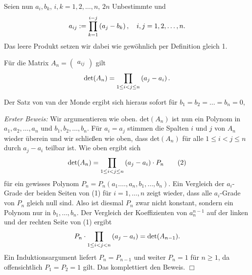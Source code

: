 \documentclass[11pt,a4paper]{article}
\begin{document}
Seien nun $a_i,b_k$, $i,k=1,2,\dots,n$, $2n$ Unbestimmte und 
\begin{gather*}
  a_{ij}:=\prod_{k=1}^{i-j}\left(a_j-b_k\right),\quad i,j=1,2,\dots,n.
\end{gather*}
Das leere Produkt setzen wir dabei wie gewöhnlich per Definition gleich 1.

\begin{theorem}
  Für die Matrix $A_n=\begin{pmatrix} a_{ij} \end{pmatrix}$ gilt   
  \begin{gather*}
    \mathrm{det}(A_n)=\prod_{1\le i<j\le n}\left(a_j-a_i\right).
  \end{gather*}
\end{theorem}
Der Satz von van der Monde ergibt sich hieraus sofort für
$b_1=b_2=\dots=b_n=0$, 

\emph{Erster Beweis:} Wir argumentieren wie oben. $\mathrm{det}(A_n)$ ist nun
ein Polynom in $a_1,a_2,\dots,a_n$ und $b_1,b_2,\dots,b_n$. Für $a_i=a_j$
stimmen die Spalten $i$ und $j$ von $A_n$ wieder überein und wir schließen wie
oben, dass $\mathrm{det}(A_n)$ für alle $1\le i<j\le n$ durch $a_j-a_i$
teilbar ist. Wie oben ergibt sich
\begin{gather*}
  \mathrm{det}(A_n)=\prod_{1\le i<j\le n}\left(a_j-a_i\right)\cdot P_n\tag{2}
\end{gather*}
für ein gewisses Polynom $P_n=P_n(a_1.\dots,a_n,b_1,\dots,b_n)$. Ein Vergleich
der $a_i$-Grade der beiden Seiten von (1) für $i=1,\dots,n$ zeigt wieder, dass
alle $a_i$-Grade von $P_n$ gleich null sind. Also ist diesmal $P_n$ zwar nicht
konstant, sondern ein Polynom nur in $b_1,\dots,b_n$.  Der Vergleich der
Koeffizienten von $a_n^{n-1}$ auf der linken und der rechten Seite von (1)
ergibt
\begin{gather*}
  P_n\cdot\prod_{1\le i<j<n}\left(a_j-a_i\right)=\mathrm{det}(A_{n-1}).
\end{gather*}
Ein Induktionsargument liefert $P_n=P_{n-1}$ und weiter $P_n=1$ für $n\ge 1$,
da offensichtlich $P_1=P_2=1$ gilt.  Das komplettiert den Beweis. \hfill
$\Box$
\end{document}
